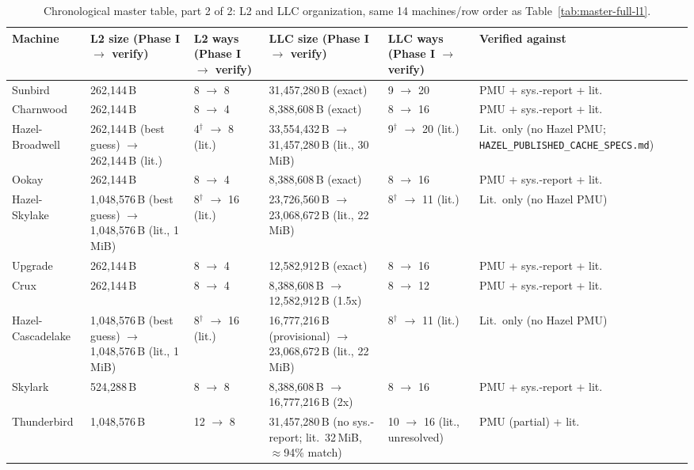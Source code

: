 \documentclass{article}
\newcommand{\cmark}{\ding{51}}
\newcommand{\xmark}{\ding{55}}
\begin{document}
\begin{table}[H]
\centering
{\tiny\setlength{\tabcolsep}{3pt}
\caption{Chronological master table, part 2 of 2: L2 and LLC organization, same 14 machines/row order as Table~\ref{tab:master-full-l1}.}
\label{tab:master-full-l2llc}
\begin{tabularx}{\textwidth}{|X|X|X|X|X|X|}
\hline
Machine & L2 size (Phase I $\to$ verify) & L2 ways (Phase I $\to$ verify) & LLC size (Phase I $\to$ verify) & LLC ways (Phase I $\to$ verify) & Verified against\\
\hline
Sunbird & 262,144\,B & 8 $\to$ 8 \cmark & 31,457,280\,B (exact) \cmark & 9 $\to$ 20 \xmark & PMU + sys.-report + lit.\\
Charnwood & 262,144\,B & 8 $\to$ 4 \xmark & 8,388,608\,B (exact) \cmark & 8 $\to$ 16 \xmark & PMU + sys.-report + lit.\\
Hazel-Broadwell & 262,144\,B (best guess) $\to$ 262,144\,B (lit.) \cmark & 4$^\dagger$ $\to$ 8 (lit.) & 33,554,432\,B $\to$ 31,457,280\,B (lit., 30\,MiB) \xmark & 9$^\dagger$ $\to$ 20 (lit.) & Lit.\ only (no Hazel PMU; \texttt{HAZEL\_PUBLISHED\_CACHE\_SPECS.md})\\
Ookay & 262,144\,B & 8 $\to$ 4 \xmark & 8,388,608\,B (exact) \cmark & 8 $\to$ 16 \xmark & PMU + sys.-report + lit.\\
Hazel-Skylake & 1,048,576\,B (best guess) $\to$ 1,048,576\,B (lit., 1\,MiB) \cmark & 8$^\dagger$ $\to$ 16 (lit.) & 23,726,560\,B $\to$ 23,068,672\,B (lit., 22\,MiB) \cmark & 8$^\dagger$ $\to$ 11 (lit.) & Lit.\ only (no Hazel PMU)\\
Upgrade & 262,144\,B & 8 $\to$ 4 \xmark & 12,582,912\,B (exact) \cmark & 8 $\to$ 16 \xmark & PMU + sys.-report + lit.\\
Crux & 262,144\,B & 8 $\to$ 4 \xmark & 8,388,608\,B $\to$ 12,582,912\,B \xmark (1.5x) & 8 $\to$ 12 \xmark & PMU + sys.-report + lit.\\
Hazel-Cascadelake & 1,048,576\,B (best guess) $\to$ 1,048,576\,B (lit., 1\,MiB) \cmark & 8$^\dagger$ $\to$ 16 (lit.) & 16,777,216\,B (provisional) $\to$ 23,068,672\,B (lit., 22\,MiB) \xmark & 8$^\dagger$ $\to$ 11 (lit.) & Lit.\ only (no Hazel PMU)\\
Skylark & 524,288\,B & 8 $\to$ 8 \cmark & 8,388,608\,B $\to$ 16,777,216\,B \xmark (2x) & 8 $\to$ 16 \xmark & PMU + sys.-report + lit.\\
Thunderbird & 1,048,576\,B & 12 $\to$ 8 \xmark & 31,457,280\,B (no sys.-report; lit.\ 32\,MiB, $\approx$94\% match) & 10 $\to$ 16 (lit., unresolved) & PMU (partial) + lit.\\

\end{tabularx}}
\end{table}
\end{document}
